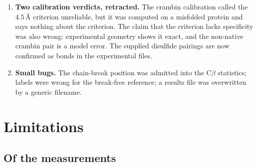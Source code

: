 \documentclass[11pt,a4paper]{article}
\newcommand{\ang}{\,\mbox{\AA}}
\begin{document}
\begin{enumerate}
  on 256 steps. I stated each with more confidence than one step count could
  support. The sweep also exposed a bug in my own contrast script, which kept
  an old pre-pLDDT result file for the 256-step runs; an empty column gave it
  away.
\item \textbf{Two calibration verdicts, retracted.} The crambin calibration
  called the $4.5\ang$ criterion unreliable, but it was computed on a misfolded
  protein and says nothing about the criterion. The claim that the criterion
  lacks specificity was also wrong: experimental geometry shows it exact, and
  the non-native crambin pair is a model error. The supplied disulfide pairings
  are now confirmed as bonds in the experimental files.
\item \textbf{Small bugs.} The chain-break position was admitted into the
  C$\beta$ statistics; labels were wrong for the break-free reference;
  a results file was overwritten by a generic filename.
\end{enumerate}

\section{Limitations}

\subsection{Of the measurements}
\end{document}
